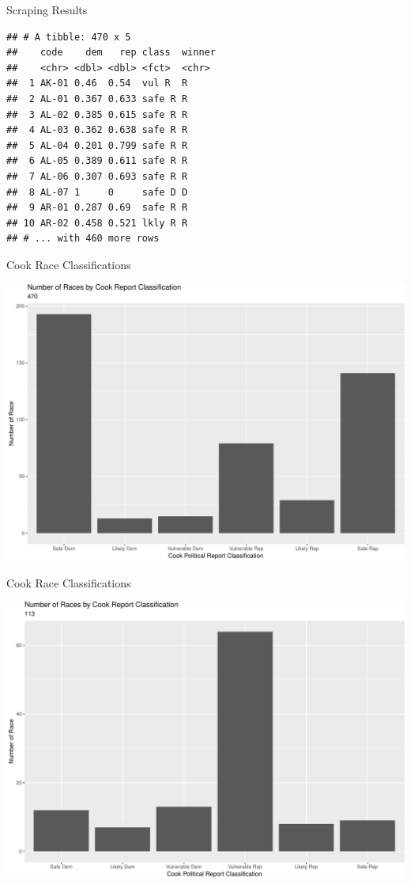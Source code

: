 \documentclass[ignorenonframetext,]{beamer}
\begin{document}
\begin{frame}[fragile]{Scraping Results}

\begin{verbatim}
## # A tibble: 470 x 5
##    code    dem   rep class  winner
##    <chr> <dbl> <dbl> <fct>  <chr> 
##  1 AK-01 0.46  0.54  vul R  R     
##  2 AL-01 0.367 0.633 safe R R     
##  3 AL-02 0.385 0.615 safe R R     
##  4 AL-03 0.362 0.638 safe R R     
##  5 AL-04 0.201 0.799 safe R R     
##  6 AL-05 0.389 0.611 safe R R     
##  7 AL-06 0.307 0.693 safe R R     
##  8 AL-07 1     0     safe D D     
##  9 AR-01 0.287 0.69  safe R R     
## 10 AR-02 0.458 0.521 lkly R R     
## # ... with 460 more rows
\end{verbatim}

\end{frame}

\begin{frame}{Cook Race Classifications}

\includegraphics{markets_models_files/figure-beamer/class all-1.pdf}

\end{frame}

\begin{frame}{Cook Race Classifications}

\includegraphics{markets_models_files/figure-beamer/class market-1.pdf}

\end{frame}
\end{document}
